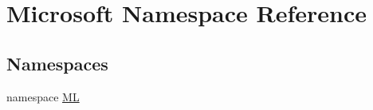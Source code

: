 \hypertarget{namespaceMicrosoft}{}\section{Microsoft Namespace Reference}
\label{namespaceMicrosoft}
\subsection*{Namespaces}
\begin{DoxyCompactItemize}
\item 
namespace \mbox{\hyperlink{namespaceMicrosoft_1_1ML}{ML}}
\end{DoxyCompactItemize}
